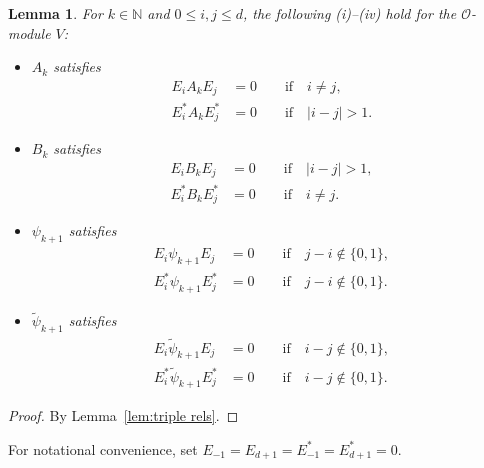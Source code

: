 \documentclass[11pt]{article}%
\theoremstyle{definition}
\theoremstyle{plain}
\newtheorem{lemma}[definition]{Lemma}
\begin{document}
\begin{lemma}\label{lem:triple rels(2)}
For $k \in \mathbb{N}$ and $0 \leq i,j \leq d$, the following {\rm(i)}--{\rm(iv)} hold for the $\mathcal{O}$-module $V$:
\begin{itemize}
\item[\rm(i)] $A_k$ satisfies
	\begin{align}
		E_iA_kE_j & = 0 \qquad \text{if} \quad i \ne j, \label{eq(1):triple rels(2)} \\
		E_i^*A_kE_j^* & = 0 \qquad \text{if} \quad |i - j| > 1. \label{eq(2):triple rels(2)}
	\end{align}
\item[\rm(ii)] $B_k$ satisfies
	\begin{align*}
		E_iB_kE_j & = 0 \qquad \text{if} \quad |i - j| > 1, \\
		E^*_iB_kE_j^* & = 0 \qquad \text{if} \quad i \ne j.
	\end{align*}
\item[\rm(iii)] $\psi_{k+1}$ satisfies
	\begin{align*}
		E_i \psi_{k+1} E_j & = 0 \qquad \text{if} \quad j - i \notin \{0, 1\}, \\
		E_i^* \psi_{k+1} E_j^* & = 0 \qquad \text{if} \quad j - i \notin \{0, 1\}.
	\end{align*}	
\item[\rm(iv)] $\tilde\psi_{k+1}$ satisfies
	\begin{align*}
		E_i \tilde\psi_{k+1} E_j & = 0 \qquad \text{if} \quad i - j \notin \{0, 1\}, \\
		E_i^* \tilde\psi_{k+1} E_j^* & = 0 \qquad \text{if} \quad i - j \notin \{0, 1\}.
	\end{align*}	
\end{itemize}
\end{lemma}
\begin{proof}
By Lemma~\ref{lem:triple rels}.
\end{proof}


For notational convenience, set $E_{-1}=E_{d+1}=E_{-1}^*=E_{d+1}^*=0$.
\end{document}
